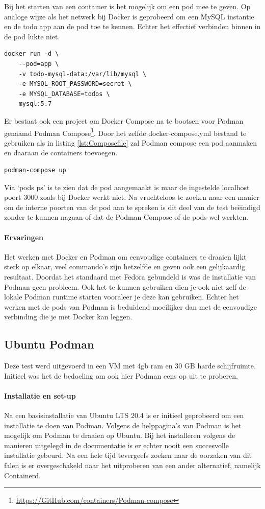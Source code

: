 Bij het starten van een container is het mogelijk om een pod mee te geven. Op analoge wijze als het netwerk bij Docker is geprobeerd om een MySQL instantie en de todo app aan de pod toe te kennen. Echter het effectief verbinden binnen in de pod lukte niet.
\begin{lstlisting}
docker run -d \
    --pod=app \
    -v todo-mysql-data:/var/lib/mysql \
    -e MYSQL_ROOT_PASSWORD=secret \
    -e MYSQL_DATABASE=todos \
    mysql:5.7
\end{lstlisting}

Er bestaat ook een project om Docker Compose na te bootsen voor Podman genaamd Podman Compose\footnote{\url{https://GitHub.com/containers/Podman-compose}}. Door het zelfde docker-compose.yml bestand te gebruiken als in listing \ref{lst:Composefile} zal Podman compose een pod aanmaken en daaraan de containers toevoegen. 

\begin{verbatim}
podman-compose up
\end{verbatim}
Via `pods ps' is te zien dat de pod aangemaakt is maar de ingestelde localhost poort 3000 zoals bij Docker werkt niet. Na vruchteloos te zoeken naar een manier om de interne poorten van de pod aan te spreken is dit deel van de test beëindigd zonder te kunnen nagaan of dat de Podman Compose of de pods wel werkten.

\paragraph{Ervaringen}
Het werken met Docker en Podman om eenvoudige containers te draaien lijkt sterk op elkaar, veel commando’s zijn hetzelfde en geven ook een gelijkaardig resultaat. Doordat het standaard met Fedora gebundeld is was de installatie van Podman geen probleem. Ook het te kunnen gebruiken dien je ook niet zelf de lokale Podman runtime starten vooraleer je deze kan gebruiken. Echter het werken met de pods van Podman is beduidend moeilijker dan met de eenvoudige verbinding die je met Docker kan leggen.

\subsection{Ubuntu Podman}
Deze test werd uitgevoerd in een VM met 4gb ram en 30 GB harde schijfruimte. Initieel was het de bedoeling om ook hier Podman eens op uit te proberen.

\paragraph{Installatie en set-up}
Na een basisinstallatie van Ubuntu LTS 20.4 is er initieel geprobeerd om een installatie te doen van Podman. Volgens de helppagina’s van Podman is het mogelijk om Podman te draaien op Ubuntu. Bij het installeren volgens de manieren uitgelegd in de documentatie is er echter nooit een succesvolle installatie gebeurd. Na een hele tijd tevergeefs zoeken naar de oorzaken van dit falen is er overgeschakeld naar het uitproberen van een ander alternatief, namelijk Containerd.

